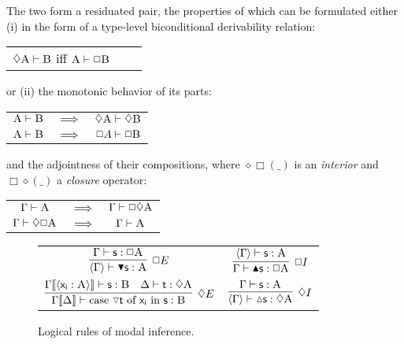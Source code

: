 The two form a residuated pair, the properties of which can be formulated either (i) in the form of a type-level biconditional derivability relation:
\begin{center}
	\begin{tabularx}{0.35\textwidth}{@{}ccc@{}}
	$\diamond \prop{A} \vdash \prop{B}$ iff $\prop{A} \vdash \Box\prop{B}$
	\end{tabularx}
\end{center}
or (ii) the monotonic behavior of its parts:
\begin{center}
	\begin{tabularx}{0.35\textwidth}{@{}ccc@{}}
		$\prop{A} \vdash \prop{B}$ & $\implies$ & $\diamond \prop{A}\vdash \diamond\prop{B}$\\
		$\prop{A} \vdash \prop{B}$ & $\implies$ & $ \Box{A}\vdash \Box\prop{B}$\\
	\end{tabularx}
\end{center}
and the adjointness of their compositions, where $\diamond\Box(\_)$ is an \textit{interior} and $\Box\diamond(\_)$ a \textit{closure} operator:
\begin{center}
	\begin{tabularx}{0.35\textwidth}{@{}ccc@{}}
		$\Gamma \vdash \prop{A}$ & $\implies$ & $\Gamma \vdash \Box\diamond\prop{A}$\\
		$\Gamma \vdash \diamond\Box\prop{A}$ & $\implies$ & $ \Gamma \vdash \prop{A}$\\
	\end{tabularx}
\end{center}

\begin{figure}
	\centering
	\begin{tabularx}{0.9875\textwidth}{@{}CC@{}}
		$\infer[\Box E]{\bracket{\Gamma} \vdash \boxelim{\term{s}}: \prop{A}}{
			\Gamma \vdash \term{s}: \Box\prop{A}
		}$
		&
		$\infer[\Box I]{\Gamma \vdash \boxintro{\term{s}}:\Box\prop{A}}{
			\bracket{\Gamma} \vdash \term{s}:\prop{A}
		}$
		\\[\smallsep]
		$\infer[\diamond E]{\Gamma\ctx{\Delta} \vdash \cterm{case \term{\diaelim t} of \term{x_i} in \term{s}}: \prop{B}}{
			\Gamma\ctx{\bracket{\term{x_i}:\prop{A}}}\vdash\term{s}:\prop{B}
			&
			\Delta \vdash \term{t}:\diamond\prop{A}
		}
		$
		&
		$\infer[\diamond I]{\bracket{\Gamma} \vdash \diaintro{\term{s}}: \diamond \prop{A}}{
			\Gamma \vdash \term{s}:\prop{A}
		}$
	\end{tabularx}
	\caption{Logical rules of modal inference.}
	\label{figure:modal_logical}
\end{figure}

